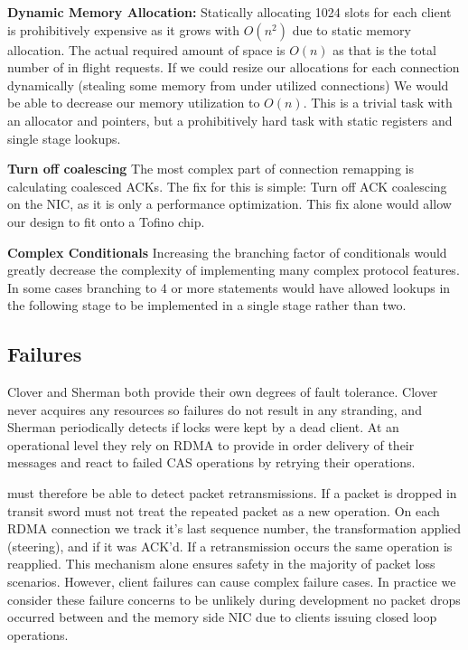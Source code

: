 \textbf{Dynamic Memory Allocation:}
Statically allocating 1024 slots for each client is prohibitively expensive as
it grows with $O(n^2)$ due to static memory allocation. The actual required
amount of space is $O(n)$ as that is the total number of in flight requests. If
we could resize our allocations for each connection dynamically (stealing some
memory from under utilized connections) We would be able to decrease our memory
utilization to $O(n)$. This is a trivial task with an allocator and pointers, but
a prohibitively hard task with static registers and single stage lookups.

\textbf{Turn off coalescing} The most complex part of connection remapping is
calculating coalesced ACKs. The fix for this is simple: Turn off ACK coalescing
on the NIC, as it is only a performance optimization. This fix alone would allow
our design to fit onto a Tofino chip.

\textbf{Complex Conditionals} Increasing the branching factor of conditionals
would greatly decrease the complexity of implementing many complex protocol
features. In some cases branching to 4 or more statements would have allowed
lookups in the following stage to be implemented in a single stage rather than
two.

\subsection{Failures}

Clover and Sherman both provide their own degrees of fault tolerance. Clover
never acquires any resources so failures do not result in any stranding, and
Sherman periodically detects if locks were kept by a dead client. At an
operational level they rely on RDMA to provide in order delivery of their
messages and react to failed CAS operations by retrying their operations.

{\sword} must therefore be able to detect packet retransmissions. If a packet is
dropped in transit sword must not treat the repeated packet as a new operation.
On each RDMA connection we track it's last sequence number, the transformation
{\sword} applied (steering), and if it was ACK'd.  If a retransmission occurs
the same operation is reapplied. This mechanism alone ensures safety in the
majority of packet loss scenarios. However, client failures can cause complex
failure cases.  In practice we consider these failure concerns to be unlikely
during development no packet drops occurred between {\sword} and the memory side
NIC due to clients issuing closed loop operations.


